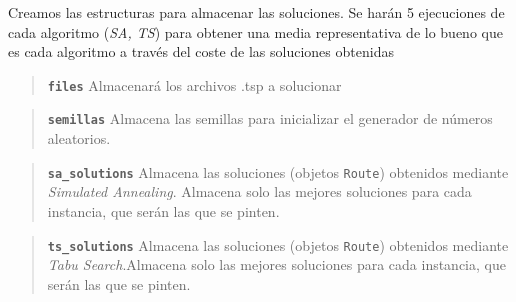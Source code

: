 \documentclass{article}
\begin{document}
    Creamos las estructuras para almacenar las soluciones. Se harán 5
ejecuciones de cada algoritmo (\emph{SA, TS}) para obtener una media
representativa de lo bueno que es cada algoritmo a través del coste de
las soluciones obtenidas

\begin{quote}
\textbf{\texttt{files}} Almacenará los archivos .tsp a solucionar
\end{quote}

\begin{quote}
\textbf{\texttt{semillas}} Almacena las semillas para inicializar el
generador de números aleatorios.
\end{quote}

\begin{quote}
\textbf{\texttt{sa\_solutions}} Almacena las soluciones (objetos
\texttt{Route}) obtenidos mediante \emph{Simulated Annealing}. Almacena 
solo las mejores soluciones para cada instancia,
que serán las que se pinten.
\end{quote}

\begin{quote}
\textbf{\texttt{ts\_solutions}} Almacena las soluciones (objetos
\texttt{Route}) obtenidos mediante \emph{Tabu Search}.Almacena solo 
las mejores soluciones para cada instancia,
que serán las que se pinten.
\end{quote}
\end{document}
